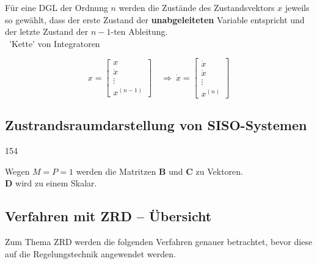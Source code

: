 \begin{minipage}[c]{0.58\columnwidth}
    Für eine DGL der Ordnung $n$ werden die Zustände des Zustandsvektors $x$ jeweils so gewählt, dass der erste Zustand der 
    \textbf{unabgeleiteten} Variable entspricht und der letzte Zustand der $n-1$-ten Ableitung. \\
    \textrightarrow\ 'Kette' von Integratoren
\end{minipage}
\hfill
\begin{minipage}[c]{0.4\columnwidth}
    $$ x = \begin{bmatrix} x \\ \dot{x} \\ \vdots \\ x^{(n-1)}\end{bmatrix}
    \quad \Rightarrow\
    \dot{x} = \begin{bmatrix} \dot{x} \\ \ddot{x} \\ \vdots \\ x^{(n)}\end{bmatrix} $$
\end{minipage}


\subsection{Zustrandsraumdarstellung von SISO-Systemen}{154}

\begin{minipage}[c]{0.5\columnwidth}
\end{minipage}
\hfill
\begin{minipage}[c]{0.45\columnwidth}
    Wegen $M = P =1$ werden die Matritzen $\bm{B}$ und $\bm{C}$ zu Vektoren. \\
    $\bm{D}$ wird zu einem Skalar.
\end{minipage}


\subsection{Verfahren mit ZRD -- Übersicht}

Zum Thema ZRD werden die folgenden Verfahren genauer betrachtet, bevor diese auf die Regelungstechnik angewendet werden.

\smallskip

